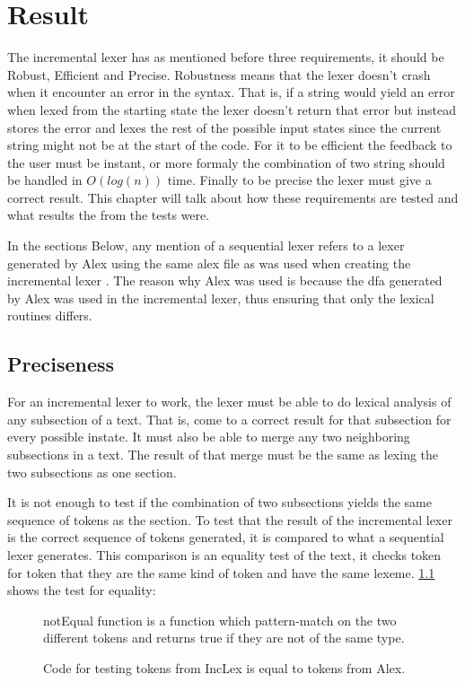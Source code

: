 \chapter{Result}
The incremental lexer has as mentioned before three requirements, it should be
Robust, Efficient and Precise. Robustness means that the lexer doesn't crash
when it encounter an error in the syntax. That is, if a string would yield an
error when lexed from the starting state the lexer doesn't return that error but
instead stores the error and lexes the rest of the possible input states since
the current string might not be at the start of the code. For it to be efficient
the feedback to the user must be instant, or more formaly the combination of two
string should be handled in $O(log(n))$ time. Finally to be precise the lexer
must give a correct result. This chapter will talk about how these requirements
are tested and what results the from the tests were.

In the sections Below, any mention of a sequential lexer refers to a lexer
generated by Alex using the same alex file as was used when creating the
incremental lexer \cite{alex}. The reason why Alex was used is because the dfa
generated by Alex was used in the incremental lexer, thus ensuring that only the
lexical routines differs.

\section{Preciseness}
For an incremental lexer to work, the lexer must be able to do lexical analysis
of any subsection of a text. That is, come to a correct result for that subsection
for every possible instate. It must also be able to merge any two neighboring
subsections in a text. The result of that merge must be the same as lexing
the two subsections as one section.

It is not enough to test if the combination of two subsections yields the
same sequence of tokens as the section. To test that the result of the
incremental lexer is the correct sequence of tokens generated, it is compared to
what a sequential lexer generates. This comparison is an equality test of
the text, it checks token for token that they are the same kind of token and
have the same lexeme.
\cref{fig:CheckEquility} shows the test for equality:
\begin{figure}[h!]
  \centering
  
  notEqual function is a function which pattern-match on the two different
  tokens and returns true if they are not of the same type.
  \caption{Code for testing tokens from IncLex is equal to tokens from Alex. 
  \label{fig:CheckEquility}}
\end{figure} 

